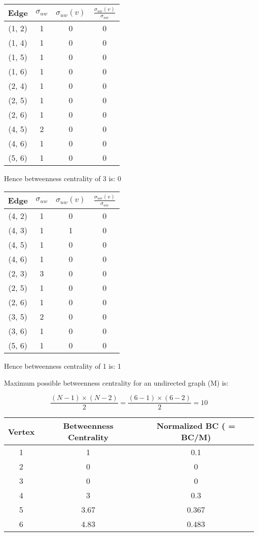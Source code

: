 \documentclass{article}
\begin{document}
\begin{itemize}
\begin{center}
\begin{tabular}{|c|c|c|c|}
    \hline
    Edge & $\sigma_{uw}$ & $\sigma_{uw}(v)$ & $\frac{\sigma_{uw}(v)}{\sigma_{uw}}$ \\
    \hline
    (1, 2) & 1 & 0 & 0 \\
    (1, 4) & 1 & 0 & 0 \\
    (1, 5) & 1 & 0 & 0 \\
    (1, 6) & 1 & 0 & 0 \\
    (2, 4) & 1 & 0 & 0 \\
    (2, 5) & 1 & 0 & 0 \\
    (2, 6) & 1 & 0 & 0 \\
    (4, 5) & 2 & 0 & 0 \\
    (4, 6) & 1 & 0 & 0 \\
    (5, 6) & 1 & 0 & 0 \\
    \hline
\end{tabular}    
\end{center}

Hence betweenness centrality of 3 is: 0

\begin{center}
\begin{tabular}{|c|c|c|c|}
    \hline
    Edge & $\sigma_{uw}$ & $\sigma_{uw}(v)$ & $\frac{\sigma_{uw}(v)}{\sigma_{uw}}$ \\
    \hline
    (4, 2) & 1 & 0 & 0 \\
    (4, 3) & 1 & 1 & 0 \\
    (4, 5) & 1 & 0 & 0 \\
    (4, 6) & 1 & 0 & 0 \\
    (2, 3) & 3 & 0 & 0 \\
    (2, 5) & 1 & 0 & 0 \\
    (2, 6) & 1 & 0 & 0 \\
    (3, 5) & 2 & 0 & 0 \\
    (3, 6) & 1 & 0 & 0 \\
    (5, 6) & 1 & 0 & 0 \\
    \hline
\end{tabular}    
\end{center}

Hence betweenness centrality of 1 is: 1

Maximum possible betweenness centrality for an undirected graph (M) is:

$$\frac{(N-1)\times(N-2)}{2} = \frac{(6-1)\times(6-2)}{2} = 10$$

\begin{center}
\begin{tabular}{|c|c|c|}
    \hline
    Vertex & Betweenness Centrality & Normalized BC ( = BC/M) \\
    \hline
    1 & 1 & 0.1 \\
    2 & 0 & 0 \\
    3 & 0 & 0 \\
    4 & 3 & 0.3 \\
    5 & 3.67 & 0.367 \\
    6 & 4.83 & 0.483 \\
    \hline
\end{tabular}    
\end{center}


\end{itemize}
\end{document}
